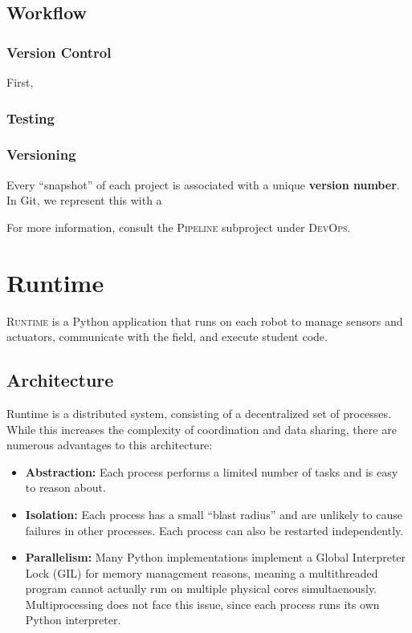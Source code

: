 \documentclass[12pt]{book}
\begin{document}
  \section{Workflow}

  \subsection{Version Control}

  First,

  \subsection{Testing}

  \subsection{Versioning}

  Every ``snapshot'' of each project is associated with a unique \textbf{version number}.
  In Git, we represent this with a

  For more information, consult the \textsc{Pipeline} subproject under \textsc{DevOps}.

  \chapter{Runtime}

  \textsc{Runtime} is a Python application that runs on each robot to manage sensors and actuators, communicate with the field, and execute student code.

  \section{Architecture}

  Runtime is a distributed system, consisting of a decentralized set of processes.
  While this increases the complexity of coordination and data sharing, there are numerous advantages to this architecture:
  \begin{itemize}
  \item
    \textbf{Abstraction:} Each process performs a limited number of tasks and is easy to reason about.
  \item
    \textbf{Isolation:} Each process has a small ``blast radius'' and are unlikely to cause failures in other processes.
    Each process can also be restarted independently.
  \item
    \textbf{Parallelism:} Many Python implementations implement a Global Interpreter Lock (GIL) for memory management reasons, meaning a multithreaded program cannot actually run on multiple physical cores simultaenously.
    Multiprocessing does not face this issue, since each process runs its own Python interpreter.
  \end{itemize}
\end{document}
